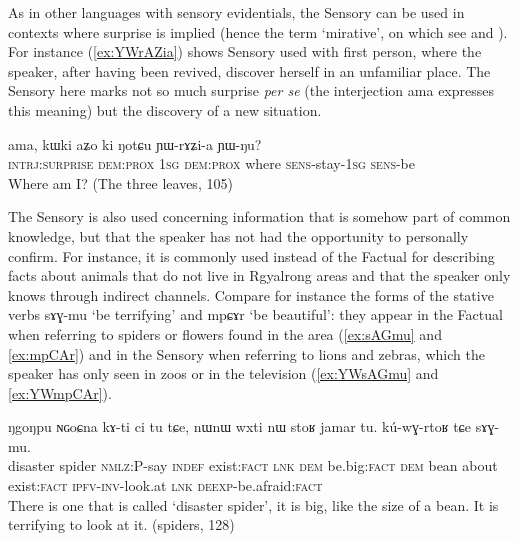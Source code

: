 \documentclass[oldfontcommands,oneside,a4paper,11pt]{article}
\newcommand{\ipa}[1]{{\phon \mbox{#1}}} %
\newcommand{\refb}[1]{(\ref{#1})}
\newcommand{\factual}[1]{\textsc{:fact}}
\begin{document}
 
As in other languages with sensory evidentials, the Sensory can be used in contexts where surprise is implied (hence the term `mirative', on which see \citealt{delancey97mirative} and \citealt{hill12mirativity}). For instance \refb{ex:YWrAZia} shows Sensory used with first person, where the speaker, after having been revived, discover herself in an unfamiliar place. The Sensory here marks not so much surprise \textit{per se} (the interjection \ipa{ama} expresses this meaning) but the discovery of a new situation.

\begin{exe}
\ex \label{ex:YWrAZia}
\gll 
\ipa{ama,}  	\ipa{kɯki}  	\ipa{aʑo}  	\ipa{ki}  	\ipa{ŋotɕu}  	\ipa{ɲɯ-rɤʑi-a}  	\ipa{ɲɯ-ŋu?}  \\
\textsc{intrj:surprise} \textsc{dem:prox} \textsc{1sg} \textsc{dem:prox} where \textsc{sens}-stay-\textsc{1sg} \textsc{sens}-be \\
\glt Where am I? (The three leaves, 105)
\end{exe}


The Sensory is also used concerning information that is somehow part of common knowledge, but that the speaker has not had the opportunity to personally confirm. For instance, it is commonly used instead of the Factual for describing facts about animals that do not live in Rgyalrong areas and that the speaker only knows through indirect channels. Compare for instance the forms of the stative verbs \ipa{sɤɣ-mu} `be terrifying' and \ipa{mpɕɤr} `be beautiful': they appear in the Factual when referring to  spiders or flowers found in the area (\ref{ex:sAGmu} and \ref{ex:mpCAr}) and in the Sensory when referring to lions and zebras, which the speaker has only seen in zoos or in the television  (\ref{ex:YWsAGmu} and \ref{ex:YWmpCAr}).
 
 \begin{exe}
\ex \label{ex:sAGmu}
\gll 
\ipa{ŋgoŋpu}  	\ipa{ɴɢoɕna}  	\ipa{kɤ-ti}  	\ipa{ci}  	\ipa{tu}  	\ipa{tɕe,}  	\ipa{nɯnɯ}  	\ipa{wxti}  	\ipa{nɯ}  	\ipa{stoʁ}  	\ipa{jamar}  	\ipa{tu.}  	\ipa{kú-wɣ-rtoʁ}  	\ipa{tɕe}  	\ipa{sɤɣ-mu.}  \\
disaster spider \textsc{nmlz}:P-say \textsc{indef} exist\factual{} \textsc{lnk} \textsc{dem} be.big\factual{} \textsc{dem} bean about exist\factual{} \textsc{ipfv-inv}-look.at \textsc{lnk} \textsc{deexp}-be.afraid\factual{}  \\
\glt There is one that is  called `disaster spider', it is big, like the size of a bean. It is terrifying to look at it. (spiders, 128)
\end{exe}
\end{document}

